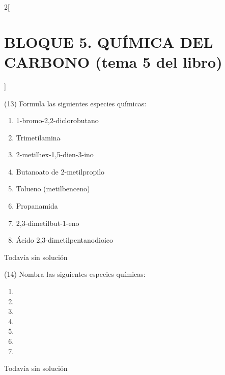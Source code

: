 \documentclass[10pt]{article}
\begin{document}
\begin{multicols}{2}[
  \section{BLOQUE 5. QUÍMICA DEL CARBONO (tema 5 del libro)}
  ]
\begin{exercise}[
    tags    = {},
    topics  = {química, química orgánica, orgánica},
    source  = {FQ 1B MGH 2016, p150, e13},
  ]
  (13) Formula las siguientes especies químicas:
  \begin{enumerate}
    \item 1-bromo-2,2-diclorobutano
    \item Trimetilamina
    \item 2-metilhex-1,5-dien-3-ino
    \item Butanoato de 2-metilpropilo
    \item Tolueno (metilbenceno)
    \item Propanamida
    \item 2,3-dimetilbut-1-eno
    \item Ácido 2,3-dimetilpentanodioico
  \end{enumerate}
\end{exercise}

\begin{solution}[print=false]
  Todavía sin solución
\end{solution}




\begin{exercise}[
    tags    = {},
    topics  = {química, química orgánica, orgánica},
    source  = {FQ 1B MGH 2016, p151, e14},
  ]
  (14) Nombra las siguientes especies químicas:
  \begin{enumerate}
    \item {}
    \item {}
    \item {}
    \item {}
    \item {}
    \item {}
    \item {}
  \end{enumerate}
\end{exercise}

\begin{solution}[print=false]
  Todavía sin solución
\end{solution}





\end{multicols}
\end{document}
